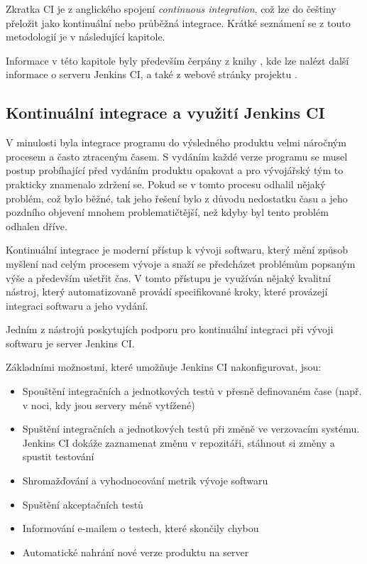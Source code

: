         Zkratka CI je z anglického spojení \emph{continuous integration}, což lze do češtiny přeložit jako kontinuální nebo průběžná 
        integrace. Krátké seznámení se z touto metodologií je v následující kapitole.

        Informace v této kapitole byly především čerpány z knihy \cite{jenkinsBook}, kde lze nalézt další informace o serveru Jenkins CI,
        a také z webové stránky projektu \cite{jenkinsWeb}.

        \subsection{Kontinuální integrace a využití Jenkins CI}
            V minulosti byla integrace programu do výsledného produktu velmi náročným procesem a často ztraceným časem.
            S vydáním každé verze programu se musel postup probíhající před vydáním produktu opakovat a pro vývojářský tým
            to prakticky znamenalo zdržení se. Pokud se v tomto procesu odhalil nějaký problém, což bylo běžné, 
            tak jeho řešení bylo z důvodu nedostatku času a jeho pozdního objevení mnohem problematičtější,
            než kdyby byl tento problém odhalen dříve.

            Kontinuální integrace je moderní přístup k vývoji softwaru, který mění způsob myšlení nad celým procesem vývoje
            a snaží se předcházet problémům popsaným výše a především ušetřit čas. V tomto přístupu je využíván nějaký
            kvalitní nástroj, který automatizovaně provádí specifikované kroky, které provázejí integraci softwaru a jeho vydání.

            Jedním z nástrojů poskytujích podporu pro kontinuální integraci při vývoji softwaru je 
            server Jenkins CI. 
            
            \medskip \noindent Základními možnostmi, které umožňuje Jenkins CI nakonfigurovat, jsou:
            
            \begin{itemize}
                \item Spouštění integračních a jednotkových testů v přesně definovaném čase (např. v noci, kdy jsou servery méně vytížené)
                \item Spuštění integračních a jednotkových testů při změně ve verzovacím systému. Jenkins CI dokáže zaznamenat změnu v repozitáři,
                    stáhnout si změny a spustit testování
                \item Shromažďování a vyhodnocování metrik vývoje softwaru
                \item Spuštění akceptačních testů
                \item Informování e-mailem o testech, které skončily chybou
                \item Automatické nahrání nové verze produktu na server
            \end{itemize} 

